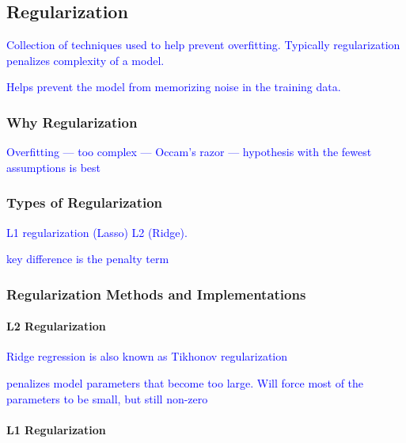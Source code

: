 \subsection{Regularization}


\textcolor{blue}{Collection of techniques used to help prevent overfitting. Typically regularization penalizes complexity of a model.}

\textcolor{blue}{Helps prevent the model from memorizing noise in the training data.}


\subsubsection{Why Regularization}

\textcolor{blue}{Overfitting --- too complex --- Occam's razor --- hypothesis with the fewest assumptions is best}


\subsubsection{Types of Regularization}

\textcolor{blue}{ L1 regularization (Lasso) L2 (Ridge).}

\textcolor{blue}{key difference is the penalty term}


\subsubsection{Regularization Methods and Implementations}

\paragraph{L2 Regularization}

\textcolor{blue}{Ridge regression is also known as {Tikhonov regularization}}

\textcolor{blue}{penalizes model parameters that become too large. Will force most of the parameters to be small, but still non-zero}


\paragraph{L1 Regularization}

